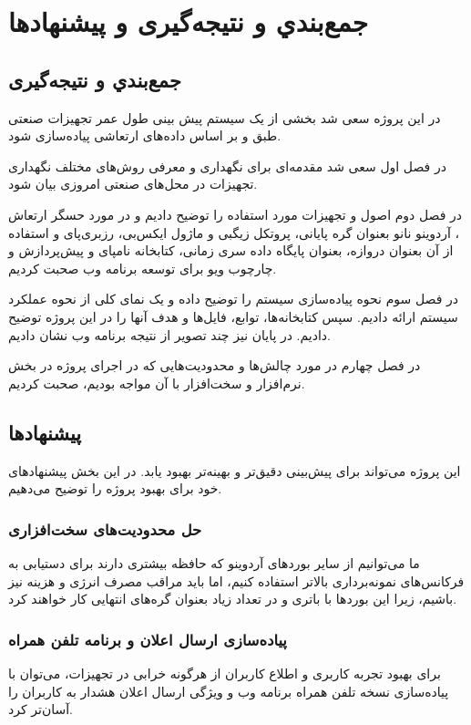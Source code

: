 \chapter{جمع‌بندي و نتيجه‌گيری و پیشنهادها}
\section{جمع‌بندي و نتيجه‌گيری}

در این پروژه سعی شد بخشی از یک سیستم پیش بینی طول عمر تجهیزات صنعتی طبق \cite{jung2017vibration} و بر اساس داده‌های ارتعاشی پیاده‌سازی شود.

در فصل اول سعی شد مقدمه‌ای برای نگهداری و معرفی روش‌های مختلف نگهداری تجهیزات در محل‌‌های صنعتی امروزی بیان شود.

در فصل دوم اصول و تجهیزات مورد استفاده را توضیح دادیم و در مورد حسگر ارتعاش ، آردوینو نانو بعنوان گره پایانی، پروتکل زیگبی و ماژول ایکس‌بی، رزبری‌پای و استفاده از آن بعنوان دروازه،  بعنوان پایگاه داده سری زمانی، کتابخانه نامپای و پیش‌پردازش و چارچوب ویو برای توسعه برنامه وب صحبت کردیم.

در فصل سوم نحوه پیاده‌سازی سیستم را توضیح داده و یک نمای کلی از نحوه عملکرد سیستم ارائه دادیم. سپس کتابخانه‌ها، توابع، فایل‌ها و هدف آنها را در این پروژه توضیح دادیم. در پایان نیز چند تصویر از نتیجه برنامه وب نشان دادیم.

در فصل چهارم در مورد چالش‌ها و محدودیت‌هایی که در اجرای پروژه در بخش نرم‌افزار و سخت‌افزار با آن مواجه بودیم، صحبت کردیم.

\section{پیشنهادها}

این پروژه می‌تواند برای پیش‌بینی دقیق‌تر و بهینه‌تر بهبود یابد. در این بخش پیشنهادهای خود برای بهبود پروژه را توضیح می‌دهیم.

\subsection{حل محدودیت‌های سخت‌افزاری}

ما می‌توانیم از سایر بوردهای آردوینو که حافظه بیشتری دارند برای دستیابی به فرکانس‌های نمونه‌برداری بالاتر استفاده کنیم، اما باید مراقب مصرف انرژی و هزینه نیز باشیم، زیرا این بوردها با باتری و در تعداد زیاد بعنوان گره‌های انتهایی کار خواهند کرد.

\subsection{پیاده‌سازی ارسال اعلان و برنامه تلفن همراه}
برای بهبود تجربه کاربری و اطلاع کاربران از هرگونه خرابی در تجهیزات، می‌توان با پیاده‌سازی نسخه تلفن همراه برنامه وب و ویژگی ارسال اعلان هشدار به کاربران را آسان‌تر کرد.

